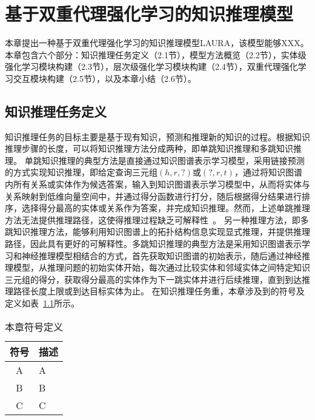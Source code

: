 \documentclass[algorithmlist, AutoFakeBold, AutoFakeSlant, figurelist, tablelist, nomlist, masters]{seuthesix}
\begin{document}
\chapter{基于双重代理强化学习的知识推理模型}
本章提出一种基于双重代理强化学习的知识推理模型LAURA，该模型能够XXX。
本章包含六个部分：知识推理任务定义（2.1节），模型方法概览（2.2节），实体级强化学习模块构建（2.3节），层次级强化学习模块构建（2.4节），双重代理强化学习交互模块构建（2.5节），以及本章小结（2.6节）。

\section{知识推理任务定义}
知识推理任务的目标主要是基于现有知识，预测和推理新的知识的过程。根据知识推理步骤的长度，可以将知识推理方法分成两种，即单跳知识推理和多跳知识推理。
单跳知识推理的典型方法是直接通过知识图谱表示学习模型，采用链接预测的方式实现知识推理，即给定查询三元组$\left(h, r, ?\right)$或$\left(?, r, t\right)$，通过将知识图谱内所有关系或实体作为候选答案，输入到知识图谱表示学习模型中，从而将实体与关系映射到低维向量空间中，并通过得分函数进行打分，随后根据得分结果进行排序，选择得分最高的实体或关系作为答案，并完成知识推理。然而，上述单跳推理方法无法提供推理路径，这使得推理过程缺乏可解释性~\cite{wang2019deeppath}。
另一种推理方法，即多跳知识推理方法，能够利用知识图谱上的拓扑结构信息实现显式推理，并提供推理路径，因此具有更好的可解释性。多跳知识推理的典型方法是采用知识图谱表示学习和神经推理模型相结合的方式，首先获取知识图谱的初始表示，随后通过神经推理模型，从推理问题的初始实体开始，每次通过比较实体和邻域实体之间特定知识三元组的得分，获取得分最高的实体作为下一跳实体并进行后续推理，直到到达推理路径长度上限或到达目标实体为止。
在知识推理任务重，本章涉及到的符号及定义如表~\ref{3_symbols}所示。
\begin{table}
  \centering
  \begin{tabular*}{0.8\textwidth}{@{\extracolsep{\fill}}cl}
		\toprule[1pt]
    符号 & 描述 \\ \hline
    A & A\\
    B & B\\
    C & C\\
		\bottomrule[1pt]
	\end{tabular*}
  \caption{本章符号定义}
  \label{3_symbols}
\end{table}
\end{document}
